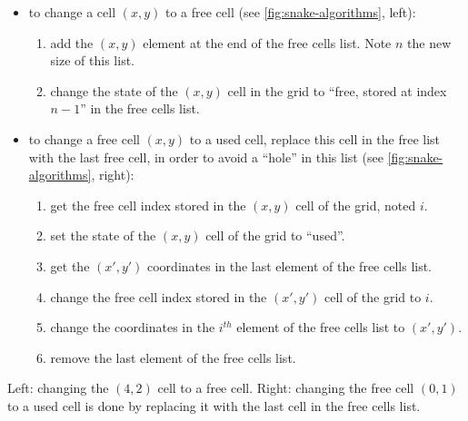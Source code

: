 \begin{itemize}
  \item to change a cell $(x,y)$ to a free cell (see
  \cref{fig:snake-algorithms}, left):

  \begin{enumerate}
    \item add the $(x,y)$ element at the end of the free cells list. Note $n$
    the new size of this list.

    \item change the state of the $(x,y)$ cell in the grid to ``free, stored at
    index $n-1$'' in the free cells list.
  \end{enumerate}

  \item to change a free cell $(x, y)$ to a used cell, replace this cell in the
  free list with the last free cell, in order to avoid a ``hole'' in this list
  (see \cref{fig:snake-algorithms}, right):

  \begin{enumerate}
    \item get the free cell index stored in the $(x,y)$ cell of the grid, noted
    $i$.

    \item set the state of the $(x,y)$ cell of the grid to ``used''.

    \item get the $(x',y')$ coordinates in the last element of the free cells
    list.

    \item change the free cell index stored in the $(x',y')$ cell of the grid
    to  $i$.

    \item change the coordinates in the $i^{th}$ element of the free cells list
    to $(x',y')$.

    \item remove the last element of the free cells list.
  \end{enumerate}
\end{itemize}

\begin{Figure}
  

  \caption{Left: changing the $(4,2)$ cell to a free cell. Right: changing the
    free cell $(0,1)$ to a used cell is done by replacing it with the last cell
    in the free cells list.}\label{fig:snake-algorithms}
\end{Figure}

